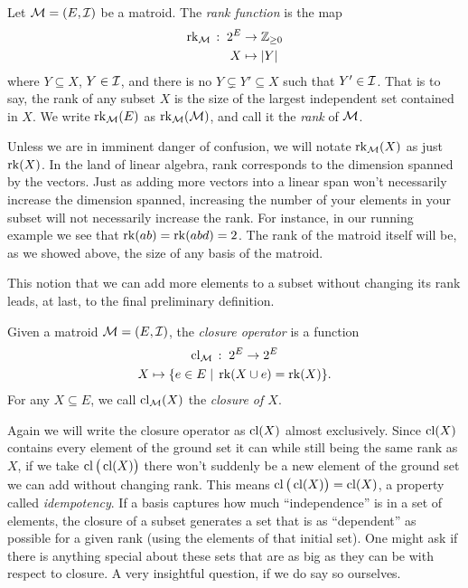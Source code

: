 \documentclass[12pt,oneside]{../../sfsuthesis}
\begin{document}
\begin{definition}[Rank]\th\label{def:rank}

    Let \( \mathcal{M} = (E, \mathcal{I}) \) be a matroid.
    The \emph{rank function} is the map
    \begin{align*}
        \operatorname{rk}_{\mathcal{M}} \, : \; 2^E & \to \mathbb{Z}_{\geq 0} \\
        X                   & \mapsto |Y|
    \end{align*}
    where \( Y \subseteq X \), \( Y \in \mathcal{I} \), and there is no \( Y \subsetneq Y' \subseteq X \) such that \( Y' \in \mathcal{I} \).
    That is to say, the rank of any subset \( X \) is the size of the largest independent set contained in \( X \).
    We write \( \operatorname{rk}_{\mathcal{M}}(E) \) as \( \operatorname{rk}_{\mathcal{M}}(\mathcal{M}) \), and call it the \emph{rank} of \( \mathcal{M} \).
\end{definition}
Unless we are in imminent danger of confusion, we will notate \( \operatorname{rk}_{\mathcal{M}}(X) \) as just \( \operatorname{rk}(X) \).
In the land of linear algebra, rank corresponds to the dimension spanned by the vectors.
Just as adding more vectors into a linear span won't necessarily increase the dimension spanned, increasing the number of your elements in your subset will not necessarily increase the rank.
For instance, in our running example we see that \( \operatorname{rk}(ab) = \operatorname{rk}(abd) = 2 \).
The rank of the matroid itself will be, as we showed above, the size of any basis of the matroid.

This notion that we can add more elements to a subset without changing its rank leads, at last, to the final preliminary definition.

\begin{definition}[Closure]\th\label{def:closure}
    Given a matroid \( \mathcal{M} = (E, \mathcal{I}) \), the \emph{closure operator} is a function
    \begin{gather*}
        \operatorname{cl}_{\mathcal{M}} \, : \; 2^E \to 2^E \\
        X \mapsto \{ e \in E \; | \; \operatorname{rk}(X \cup e) = \operatorname{rk}(X) \}.
    \end{gather*}
    For any \( X \subseteq E \), we call \( \operatorname{cl}_{\mathcal{M}}(X) \) the \emph{closure of \( X \)}.

\end{definition}

Again we will write the closure operator as \( \operatorname{cl}(X) \) almost exclusively.
Since \( \operatorname{cl}(X) \) contains every element of the ground set it can while still being the same rank as \( X \), if we take \( \operatorname{cl}\big(\operatorname{cl}(X)\big) \) there won't suddenly be a new element of the ground set we can add without changing rank.
This means \( \operatorname{cl}\big(\operatorname{cl}(X)\big) = \operatorname{cl}(X) \), a property called \emph{idempotency}.
If a basis captures how much ``independence'' is in a set of elements, the closure of a subset generates a set that is as ``dependent'' as possible for a given rank (using the elements of that initial set).
One might ask if there is anything special about these sets that are as big as they can be with respect to closure.
A very insightful question, if we do say so ourselves.
\end{document}
